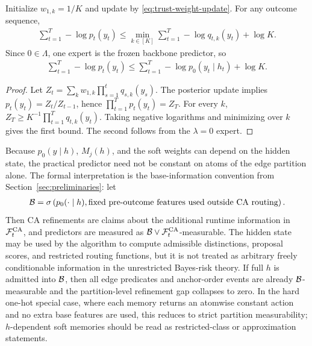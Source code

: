 \begin{theorem}
\label{thm:dgm-no-harm-log-loss}
Initialize $w_{1,k}=1/K$ and update by \eqref{eq:trust-weight-update}. For any outcome sequence,
\begin{align*}
\sum_{t=1}^T -\log p_t(y_t)
\le
\min_{k\in[K]}\sum_{t=1}^T -\log q_{t,k}(y_t)+\log K.
\end{align*}
Since $0\in\Lambda$, one expert is the frozen backbone predictor, so
\begin{align*}
\sum_{t=1}^T -\log p_t(y_t)
\le
\sum_{t=1}^T -\log p_0(y_t\mid h_t)+\log K.
\end{align*}
\end{theorem}

\begin{proof}
Let $Z_t=\sum_k w_{1,k}\prod_{s=1}^t q_{s,k}(y_s)$. The posterior update implies $p_t(y_t)=Z_t/Z_{t-1}$, hence $\prod_{t=1}^T p_t(y_t)=Z_T$. For every $k$, $Z_T\ge K^{-1}\prod_{t=1}^T q_{t,k}(y_t)$. Taking negative logarithms and minimizing over $k$ gives the first bound. The second follows from the $\lambda=0$ expert.
\end{proof}

Because $p_0(y\mid h)$, $M_j(h)$, and the soft weights can depend on the hidden state, the practical predictor need not be constant on atoms of the edge partition alone. The formal interpretation is the base-information convention from Section~\ref{sec:preliminaries}: let
\begin{align*}
\mathcal{B}=\sigma\left(p_0(\cdot\mid h),\text{fixed pre-outcome features used outside CA routing}\right).
\end{align*}
Then CA refinements are claims about the additional runtime information in $\mathcal{F}_t^{\mathrm{CA}}$, and predictors are measured as $\mathcal{B}\vee\mathcal{F}_t^{\mathrm{CA}}$-measurable. The hidden state may be used by the algorithm to compute admissible distinctions, proposal scores, and restricted routing functions, but it is not treated as arbitrary freely conditionable information in the unrestricted Bayes-risk theory. If full $h$ is admitted into $\mathcal{B}$, then all edge predicates and anchor-order events are already $\mathcal{B}$-measurable and the partition-level refinement gap collapses to zero. In the hard one-hot special case, where each memory returns an atomwise constant action and no extra base features are used, this reduces to strict partition measurability; $h$-dependent soft memories should be read as restricted-class or approximation statements.

